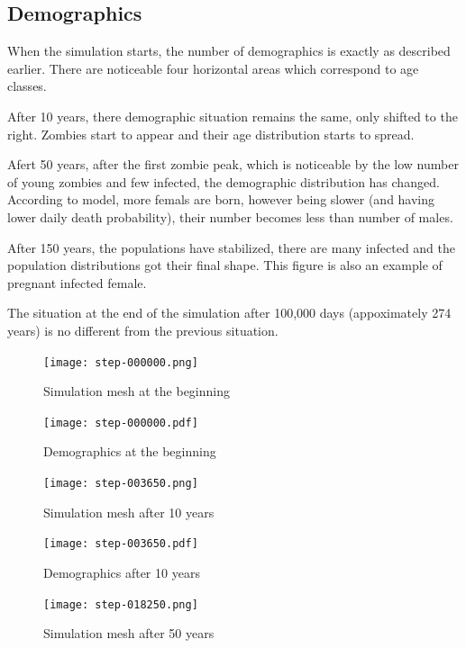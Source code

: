 \documentclass[a4paper]{article}
\begin{document}
\subsection{Demographics}

When the simulation starts, the number of demographics is exactly as described earlier.
There are noticeable four horizontal areas which correspond to age classes.

After 10 years, there demographic situation remains the same, only shifted to the right.
Zombies start to appear and their age distribution starts to spread.

Afert 50 years, after the first zombie peak, which is noticeable by the low number of young zombies and few infected, the demographic distribution has changed.
According to model, more femals are born, however being slower (and having lower daily death probability), their number becomes less than number of males.

After 150 years, the populations have stabilized, there are many infected and the population distributions got their final shape.
This figure is also an example of pregnant infected female.

The situation at the end of the simulation after 100,000 days (appoximately 274 years) is no different from the previous situation.

\begin{figure}[pht]
    \centering
    \texttt{[image: step-000000.png]}
    \caption{Simulation mesh at the beginning}
\end{figure}

\begin{figure}[pht]
    \centering
    \texttt{[image: step-000000.pdf]}
    \caption{Demographics at the beginning}
\end{figure}

\begin{figure}[pht]
    \centering
    \texttt{[image: step-003650.png]}
    \caption{Simulation mesh after 10 years}
\end{figure}

\begin{figure}[pht]
    \centering
    \texttt{[image: step-003650.pdf]}
    \caption{Demographics after 10 years}
\end{figure}

\begin{figure}[pht]
    \centering
    \texttt{[image: step-018250.png]}
    \caption{Simulation mesh after 50 years}
\end{figure}
\end{document}
